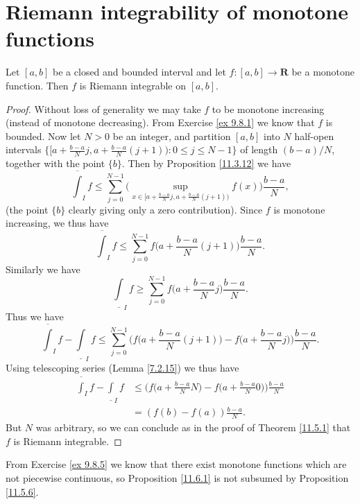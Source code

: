 \section{Riemann integrability of monotone functions}\label{sec 11.6}

\begin{proposition}\label{11.6.1}
    Let \([a, b]\) be a closed and bounded interval and let \(f : [a, b] \to \mathbf{R}\) be a monotone function.
    Then \(f\) is Riemann integrable on \([a, b]\).
\end{proposition}

\begin{proof}
    Without loss of generality we may take \(f\) to be monotone increasing (instead of monotone decreasing).
    From Exercise \ref{ex 9.8.1} we know that \(f\) is bounded.
    Now let \(N > 0\) be an integer, and partition \([a, b]\) into \(N\) half-open intervals \(\{[a + \frac{b - a}{N} j, a + \frac{b - a}{N} (j + 1)) : 0 \leq j \leq N - 1\}\) of length \((b - a) / N\), together with the point \(\{b\}\).
    Then by Proposition \ref{11.3.12} we have
    \[
        \overline{\int}_I f \leq \sum_{j = 0}^{N - 1} \Bigg(\sup_{x \in [a + \frac{b - a}{N} j, a + \frac{b - a}{N} (j + 1))} f(x)\Bigg) \frac{b - a}{N},
    \]
    (the point \(\{b\}\) clearly giving only a zero contribution).
    Since \(f\) is monotone increasing, we thus have
    \[
        \overline{\int}_I f \leq \sum_{j = 0}^{N - 1} f\bigg(a + \frac{b - a}{N} (j + 1)\bigg) \frac{b - a}{N}.
    \]
    Similarly we have
    \[
        \underline{\int}_I f \geq \sum_{j = 0}^{N - 1} f\bigg(a + \frac{b - a}{N} j\bigg) \frac{b - a}{N}.
    \]
    Thus we have
    \[
        \overline{\int}_I f - \underline{\int}_I f \leq \sum_{j = 0}^{N - 1} \Bigg(f\bigg(a + \frac{b - a}{N} (j + 1)\bigg) - f\bigg(a + \frac{b - a}{N} j\bigg)\Bigg) \frac{b - a}{N}.
    \]
    Using telescoping series (Lemma \ref{7.2.15}) we thus have
    \begin{align*}
        \overline{\int}_I f - \underline{\int}_I f & \leq \Bigg(f\bigg(a + \frac{b - a}{N} N\bigg) - f\bigg(a + \frac{b - a}{N} 0\bigg)\Bigg) \frac{b - a}{N} \\
                                                   & = (f(b) - f(a)) \frac{b - a}{N}.
    \end{align*}
    But \(N\) was arbitrary, so we can conclude as in the proof of Theorem \ref{11.5.1} that \(f\) is Riemann integrable.
\end{proof}

\begin{remark}\label{11.6.2}
    From Exercise \ref{ex 9.8.5} we know that there exist monotone functions which are not piecewise continuous, so Proposition \ref{11.6.1} is not subsumed by Proposition \ref{11.5.6}.
\end{remark}